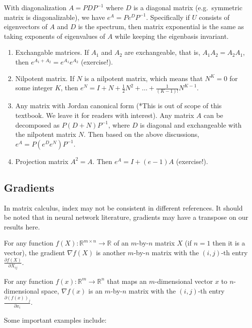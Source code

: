 \documentclass[
]{book}
\theoremstyle{definition}
\theoremstyle{definition}
\theoremstyle{definition}
\theoremstyle{definition}
\theoremstyle{remark}
\begin{document}
With diagonalization \(A=PDP^{-1}\) where \(D\) is a diagonal matrix (e.g.~symmetric matrix is diagonalizable), we have \(e^A=Pe^DP^{-1}.\) Specifically if \(U\) consists of eigenvectors of \(A\) and \(D\) is the spectrum, then matrix exponential is the same as taking exponents of eigenvalues of \(A\) while keeping the eigenbasis invariant.

\begin{enumerate}
\def\labelenumi{\arabic{enumi}.}
\setcounter{enumi}{2}
\item
  Exchangable matrices. If \(A_1\) and \(A_2\) are exchangeable, that is, \(A_1A_2=A_2A_1\), then \(e^{A_1+A_2}=e^{A_1}e^{A_2}\) (exercise!).
\item
  Nilpotent matrix. If \(N\) is a nilpotent matrix, which means that \(N^K=0\) for some integer \(K\), then \(e^N=I+N+\frac12N^2+\ldots+\frac1{(K-1)!}N^{K-1}.\)
\item
  Any matrix with Jordan canonical form (*This is out of scope of this textbook. We leave it for readers with interest). Any matrix \(A\) can be decomposed as \(P(D+N)P^{-1}\), where \(D\) is diagonal and exchangeable with the nilpotent matrix \(N\). Then based on the above discussions, \(e^A=P(e^De^N)P^{-1}\).
\item
  Projection matrix \(A^2=A\). Then \(e^A=I+(e-1)A\) (exercise!).
\end{enumerate}

\hypertarget{gradients}{%
\subsection{Gradients}\label{gradients}}

In matrix calculus, index may not be consistent in different references. It should be noted that in neural network literature, gradients may have a transpose on our results here.

For any function \(f(X):\mathbb{R}^{m\times n}\rightarrow \mathbb{R}\) of an \(m\)-by-\(n\) matrix \(X\) (if \(n=1\) then it is a vector), the gradient \(\nabla f(X)\) is another \(m\)-by-\(n\) matrix with the \((i,j)\)-th entry \(\frac{\partial f(X)}{\partial X_{ij}}\).

For any function \(f(x):\mathbb{R}^{m}\rightarrow \mathbb{R}^n\) that maps an \(m\)-dimensional vector \(x\) to \(n\)-dimensional space, \(\nabla f(x)\) is an \(m\)-by-\(n\) matrix with the \((i,j)\)-th entry \(\frac{\partial (f(x))_j}{\partial x_i}\).

Some important examples include:
\end{document}

